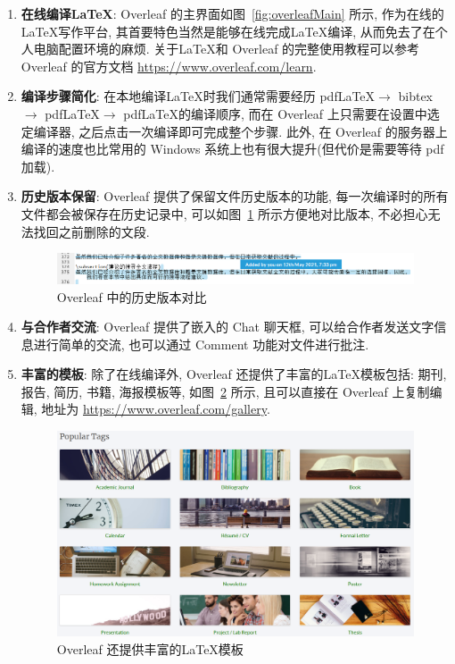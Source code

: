 \documentclass{formatBook}
\begin{document}
\begin{enumerate}
    \item \textbf{在线编译\LaTeX }: Overleaf 的主界面如图~\ref{fig:overleafMain} 所示, 作为在线的\LaTeX 写作平台, 其首要特色当然是能够在线完成\LaTeX 编译, 从而免去了在个人电脑配置环境的麻烦. 关于\LaTeX 和 Overleaf 的完整使用教程可以参考 Overleaf 的官方文档 \url{https://www.overleaf.com/learn}.
    \item \textbf{编译步骤简化}: 在本地编译\LaTeX 时我们通常需要经历 pdf\LaTeX $\rightarrow$ bibtex $\rightarrow$ pdf\LaTeX $\rightarrow$ pdf\LaTeX 的编译顺序, 而在 Overleaf 上只需要在设置中选定编译器, 之后点击一次编译即可完成整个步骤. 此外, 在 Overleaf 的服务器上编译的速度也比常用的 Windows 系统上也有很大提升(但代价是需要等待 pdf 加载).
    \item \textbf{历史版本保留}: Overleaf 提供了保留文件历史版本的功能, 每一次编译时的所有文件都会被保存在历史记录中, 可以如图~\ref{fig:history} 所示方便地对比版本, 不必担心无法找回之前删除的文段.
          \begin{figure}[H]
              \centering
              \includegraphics[width=\textwidth]{figure/history.png}
              \caption{Overleaf 中的历史版本对比}
              \label{fig:history}
          \end{figure}
    \item \textbf{与合作者交流}: Overleaf 提供了嵌入的 Chat 聊天框, 可以给合作者发送文字信息进行简单的交流, 也可以通过 Comment 功能对文件进行批注.
    \item \textbf{丰富的模板}: 除了在线编译外, Overleaf 还提供了丰富的\LaTeX 模板包括: 期刊, 报告, 简历, 书籍, 海报模板等, 如图~\ref{fig:template} 所示, 且可以直接在 Overleaf 上复制编辑, 地址为 \url{https://www.overleaf.com/gallery}.
          \begin{figure}[htbp]
              \centering
              \includegraphics[width=\textwidth]{figure/template.png}
              \caption{Overleaf 还提供丰富的\LaTeX 模板}
              \label{fig:template}
          \end{figure}
\end{enumerate}
\end{document}
